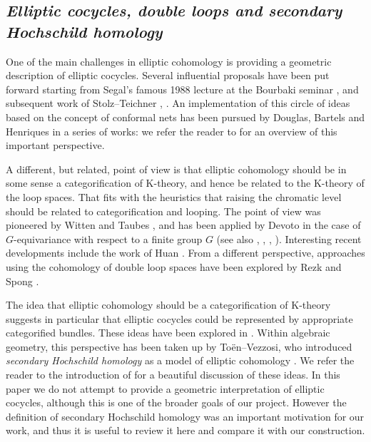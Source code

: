 \documentclass[11pt,letterpaper]{amsart}
\begin{document}
\subsection*{\emph{Elliptic cocycles, double loops and secondary Hochschild homology}}
One of the  main challenges in elliptic cohomology is providing a geometric description of elliptic cocycles. Several influential proposals have been put forward starting from Segal's famous 1988 lecture at the Bourbaki seminar \cite{Segal88}, and subsequent work of   Stolz--Teichner \cite{EllObj},  \cite{STII}.  An implementation of this circle of ideas based on the concept of conformal nets has been pursued by Douglas, Bartels and Henriques in a series of works:  we refer the reader to \cite{douglas2011topological}  for an overview of this important perspective. 





A different, but related, point of view is that elliptic cohomology  should be in some sense a categorification of K-theory, and hence be related to the K-theory of the loop spaces. That fits with the heuristics that raising the chromatic level should be related to categorification and looping. 
The point of view was pioneered by Witten \cite{WitQuant}\cite{WitDir} and Taubes \cite{Taub}, and has been applied by Devoto \cite{Dev96} in the case of $G$-equivariance with respect to a finite group $G$ (see also \cite{Mor09}, \cite{Gan09}, \cite{Gan13}, \cite{Dov19}). Interesting  recent developments include the work of Huan \cite{Huan18a} \cite{Huan18b}. From a different perspective, approaches using the cohomology of double loop spaces have been explored by Rezk \cite{Rez20} and Spong \cite{Spo}\cite{Spo19}\cite{Spo21}. 



The idea that elliptic cohomology should be a categorification of K-theory suggests in particular that elliptic cocycles could be represented by appropriate categorified bundles. These ideas have been explored in \cite{baas2004two}. Within algebraic geometry, this perspective has been taken up by To\"en--Vezzosi,  who introduced   \emph{secondary Hochschild homology} as a model of elliptic cohomology \cite{TVChernIIFR}. We refer the reader to the introduction of \cite{TVChernENG} for a beautiful discussion of these ideas. In this paper we do not attempt to provide a geometric  interpretation of elliptic cocycles, although this is one of the broader goals of our project. However the definition of secondary Hochschild homology was an important motivation for our work, and thus it is useful  to review it here  and compare it with our construction.
\end{document}
